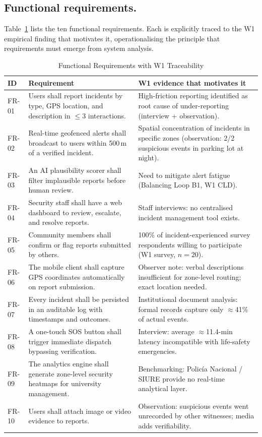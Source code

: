 \documentclass[12pt,a4paper]{article}
\begin{document}
\subsection{Functional requirements.}
Table~\ref{tab:fr} lists the ten functional requirements.
Each is explicitly traced to the W1 empirical finding that
motivates it, operationalising the principle that requirements must
emerge from system analysis.

\begin{table}[h!]
\caption{Functional Requirements with W1 Traceability}
\label{tab:fr}
\centering
\begin{tabularx}{\textwidth}{lXX}
\toprule
\textbf{ID} & \textbf{Requirement} & \textbf{W1 evidence that motivates it} \\
\midrule
FR-01 & Users shall report incidents by type, GPS location, and description in $\leq$3 interactions. & High-friction reporting identified as root cause of under-reporting (interview + observation). \\
FR-02 & Real-time geofenced alerts shall broadcast to users within 500\,m of a verified incident. & Spatial concentration of incidents in specific zones (observation: 2/2 suspicious events in parking lot at night). \\
FR-03 & An AI plausibility scorer shall filter implausible reports before human review. & Need to mitigate alert fatigue (Balancing Loop B1, W1 CLD). \\
FR-04 & Security staff shall have a web dashboard to review, escalate, and resolve reports. & Staff interviews: no centralised incident management tool exists. \\
FR-05 & Community members shall confirm or flag reports submitted by others. & 100\% of incident-experienced survey respondents willing to participate (W1 survey, $n=20$). \\
FR-06 & The mobile client shall capture GPS coordinates automatically on report submission. & Observer note: verbal descriptions insufficient for zone-level routing; exact location needed. \\
FR-07 & Every incident shall be persisted in an auditable log with timestamps and outcomes. & Institutional document analysis: formal records capture only $\approx$41\% of actual events. \\
FR-08 & A one-touch SOS button shall trigger immediate dispatch bypassing verification. & Interview: average $\approx$11.4-min latency incompatible with life-safety emergencies. \\
FR-09 & The analytics engine shall generate zone-level security heatmaps for university management. & Benchmarking: Policía Nacional / SIURE provide no real-time analytical layer. \\
FR-10 & Users shall attach image or video evidence to reports. & Observation: suspicious events went unrecorded by other witnesses; media adds verifiability. \\
\bottomrule
\end{tabularx}
\end{table}
\end{document}
